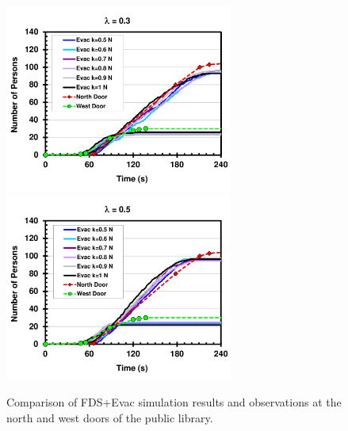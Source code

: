 \documentclass[12pt,a4paper,final,twoside]{stylevk}
\begin{document}
\begin{enumerate}
%
\begin{figure}[!tb]
  \centerline{
    \includegraphics[clip=true,
    width=75mm]{FIGURES/HUT_Library_Results_L0p3} 
    \includegraphics[clip=true,
    width=75mm]{FIGURES/HUT_Library_Results_L0p5} 
  }
  \caption{Comparison of FDS+Evac simulation results and observations
    at the north and west doors of the public
    library.}\label{Fig_KirjastoResults}
\end{figure}
  

\end{enumerate}
\end{document}
